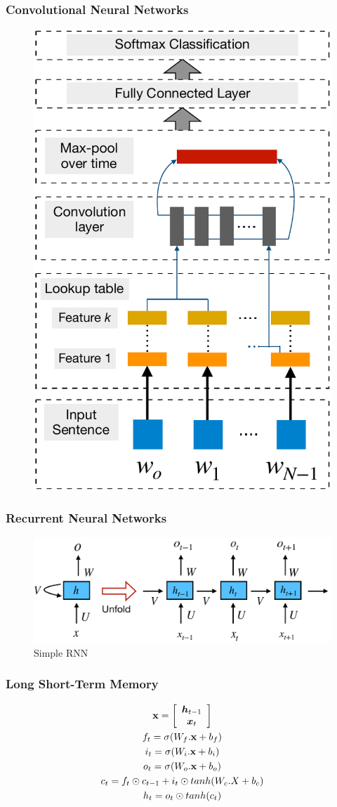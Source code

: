 \documentclass[presentation]{beamer}
\begin{document}
\begin{frame}
    \frametitle{Convolutional Neural Networks}
    \begin{figure}
        \centering
        \includegraphics[width=0.4\linewidth]{collobertCNN.pdf}
    \end{figure}

\end{frame}

\begin{frame}
    \frametitle{Recurrent Neural Networks}
    
    \begin{figure}
        \centering
        \includegraphics[width=\linewidth]{elmanrnn.pdf}
        \caption{Simple RNN}
    \end{figure}
\end{frame}

\begin{frame}
    \frametitle{Long Short-Term Memory}

    \begin{gather}
        {\bf x} = \left[ {\begin{array}{c}
            \bm{h}_{t-1}\\
            \bm{x}_t \\
            \end{array} } \right]\\
        f_t = \sigma(W_f . {\bf x} + b_f)\\
        i_t = \sigma(W_i . {\bf x} + b_i) \\
        o_t = \sigma(W_o . {\bf x} + b_o)\\
        c_t = f_t \odot c_{t-1} + i_t \odot tanh(W_c . X + b_c) \\
        h_t = o_t \odot tanh(c_t)
    \end{gather}

\end{frame}
\end{document}
